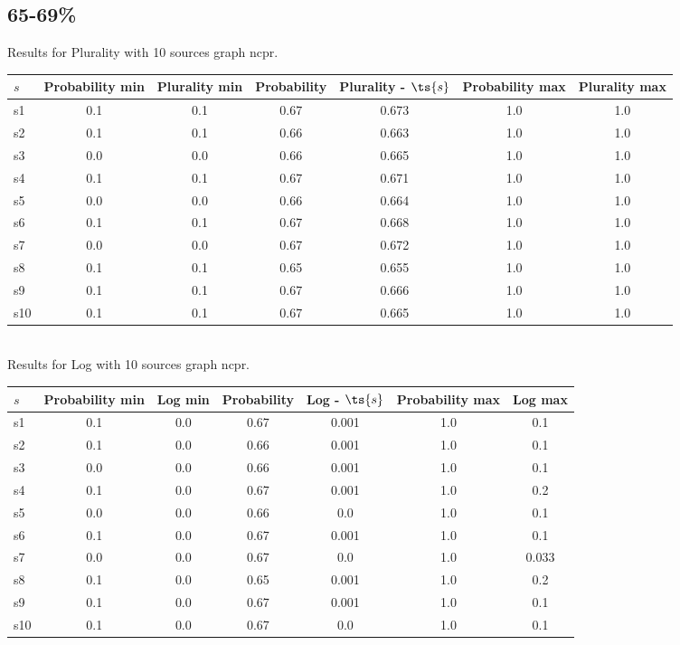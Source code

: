 \documentclass{article}
\begin{document}
\newpage

\subsection{65-69\%}

\noindent Results for Plurality with 10 sources graph ncpr.

\noindent\begin{tabular}{|l|c|c|c|c|c|c|}
\hline
$s$& Probability min & Plurality min & Probability & Plurality - $\ts{s}$ & Probability max & Plurality max\\
\hline
s1 &0.1 & 0.1 & 0.67 & 0.673 & 1.0 & 1.0\\
\hline
s2 &0.1 & 0.1 & 0.66 & 0.663 & 1.0 & 1.0\\
\hline
s3 &0.0 & 0.0 & 0.66 & 0.665 & 1.0 & 1.0\\
\hline
s4 &0.1 & 0.1 & 0.67 & 0.671 & 1.0 & 1.0\\
\hline
s5 &0.0 & 0.0 & 0.66 & 0.664 & 1.0 & 1.0\\
\hline
s6 &0.1 & 0.1 & 0.67 & 0.668 & 1.0 & 1.0\\
\hline
s7 &0.0 & 0.0 & 0.67 & 0.672 & 1.0 & 1.0\\
\hline
s8 &0.1 & 0.1 & 0.65 & 0.655 & 1.0 & 1.0\\
\hline
s9 &0.1 & 0.1 & 0.67 & 0.666 & 1.0 & 1.0\\
\hline
s10 &0.1 & 0.1 & 0.67 & 0.665 & 1.0 & 1.0\\
\hline
\end{tabular}\\

\noindent Results for Log with 10 sources graph ncpr.

\noindent\begin{tabular}{|l|c|c|c|c|c|c|}
\hline
$s$& Probability min & Log min & Probability & Log - $\ts{s}$ & Probability max & Log max\\
\hline
s1 &0.1 & 0.0 & 0.67 & 0.001 & 1.0 & 0.1\\
\hline
s2 &0.1 & 0.0 & 0.66 & 0.001 & 1.0 & 0.1\\
\hline
s3 &0.0 & 0.0 & 0.66 & 0.001 & 1.0 & 0.1\\
\hline
s4 &0.1 & 0.0 & 0.67 & 0.001 & 1.0 & 0.2\\
\hline
s5 &0.0 & 0.0 & 0.66 & 0.0 & 1.0 & 0.1\\
\hline
s6 &0.1 & 0.0 & 0.67 & 0.001 & 1.0 & 0.1\\
\hline
s7 &0.0 & 0.0 & 0.67 & 0.0 & 1.0 & 0.033\\
\hline
s8 &0.1 & 0.0 & 0.65 & 0.001 & 1.0 & 0.2\\
\hline
s9 &0.1 & 0.0 & 0.67 & 0.001 & 1.0 & 0.1\\
\hline
s10 &0.1 & 0.0 & 0.67 & 0.0 & 1.0 & 0.1\\
\hline
\end{tabular}\\
\end{document}
